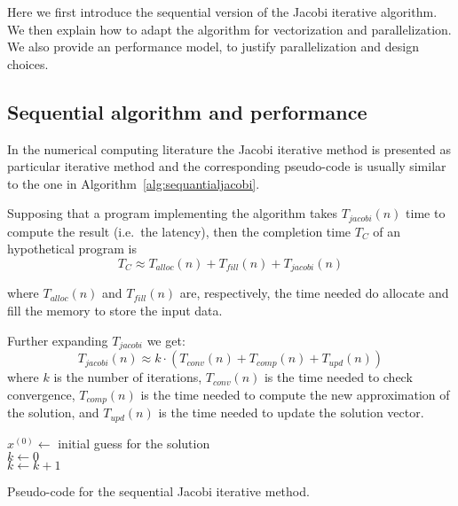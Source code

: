 Here we first introduce the sequential version of the Jacobi iterative algorithm.
We then explain how to adapt the algorithm for vectorization and parallelization.
We also provide an performance model, to justify parallelization and design choices.

\subsection{Sequential algorithm and performance}\label{subsec:seq}
In the numerical computing literature the Jacobi iterative method is presented as particular iterative method and the corresponding pseudo-code is usually similar to the one in Algorithm~\ref{alg:sequantialjacobi}.

Supposing that a program implementing the algorithm takes $T_{jacobi}(n)$ time to compute the result (i.e.\ the latency), then the completion time $T_C$ of an hypothetical program is
\[
	T_C \approx T_{alloc}(n) + T_{fill}(n) + T_{jacobi}(n)
\]

where $T_{alloc}(n)$ and $T_{fill}(n)$ are, respectively, the time needed do allocate and fill the memory to store the input data.

Further expanding $T_{jacobi}$ we get:
\[
	T_{jacobi}(n) \approx k \cdot (T_{conv}(n) + T_{comp}(n) + T_{upd}(n))
\]
where $k$ is the number of iterations, $T_{conv}(n)$ is the time needed to check convergence, $T_{comp}(n)$ is the time needed to compute the new approximation of the solution, and $T_{upd}(n)$ is the time needed to update the solution vector.

\begin{algorithm}[ht]
	\vspace{1em}
	\BlankLine			
	$x^{(0)} \leftarrow $ initial guess for the solution\\
	$k \leftarrow 0$\\
	{
		$k \leftarrow k + 1$\\
	}
\caption{Pseudo-code for the sequential Jacobi iterative method.}
\label{alg:sequantialjacobi}
\end{algorithm}


